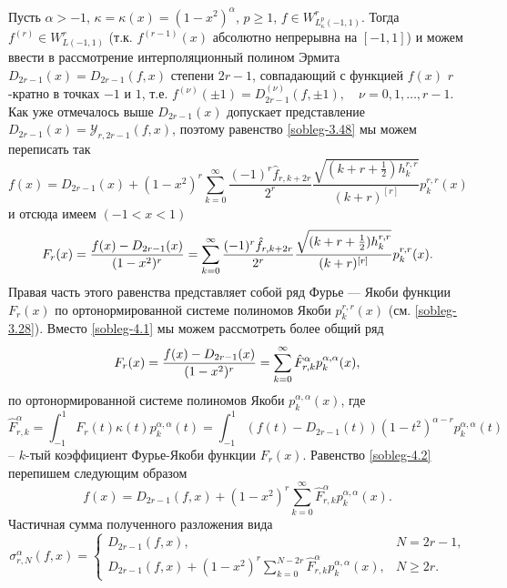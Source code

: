 Пусть $\alpha>-1$, $\kappa=\kappa(x)=(1-x^2)^\alpha$, $p\ge1$, $f\in W^r_{L^p_\kappa(-1,1)}$. Тогда $f^{(r)}\in W^r_{L(-1,1)}$ (т.к. $f^{(r-1)}(x)$ абсолютно непрерывна на $[-1,1]$) и можем ввести в рассмотрение интерполяционный полином Эрмита $D_{2r-1}(x)=D_{2r-1}(f,x)$ степени $2r-1$,  совпадающий с функцией $f(x)$ $r$-кратно в точках $-1$ и $1$, т.е. $f^{(\nu)}(\pm1)=D_{2r-1}^{(\nu)}(f,\pm1),\quad \nu=0,1,\ldots, r-1$. Как уже отмечалось выше  $D_{2r-1}(x)$ допускает представление $D_{2r-1}(x)=\mathcal{ Y}_{r,2r-1}(f,x)$, поэтому равенство \eqref{sobleg-3.48} мы можем переписать так
\begin{equation*}
f(x)=D_{2r-1}(x)+
(1-x^2)^r\sum_{k=0}^\infty\frac{(-1)^r\hat f_{r,k+2r}}{2^r} \frac{\sqrt{(k+r+\frac12)h_k^{r,r}}}{ (k+r)^{[r]}}p_{k}^{r,r}(x)
 \end{equation*}
 и отсюда имеем $(-1<x<1)$
\begin{equation}\label{sobleg-4.1}
F_r(x)={f(x)-D_{2r-1}(x)\over(1-x^2)^r}=
 \sum_{k=0}^\infty\frac{(-1)^r\hat f_{r,k+2r}}{2^r} \frac{\sqrt{(k+r+\frac12)h_k^{r,r}}}{ (k+r)^{[r]}}p_{k}^{r,r}(x).
\end{equation}
Правая часть этого равенства представляет собой ряд Фурье --- Якоби функции $F_r(x)$ по ортонормированной системе полиномов Якоби $p_k^{r,r}(x)$ (см. \eqref{sobleg-3.28}). Вместо \eqref{sobleg-4.1} мы можем рассмотреть более общий ряд
\begin{equation}\label{sobleg-4.2}
F_r(x)={f(x)-D_{2r-1}(x)\over(1-x^2)^r}=
 \sum_{k=0}^\infty \hat F_{r,k}^\alpha p_{k}^{\alpha,\alpha}(x),
\end{equation}
по ортонормированной системе полиномов Якоби $p_{k}^{\alpha,\alpha}(x)$, где
\begin{equation}\label{sobleg-4.3}
\hat F^\alpha_{r,k}=\int_{-1}^1F_r(t)\kappa(t) p_{k}^{\alpha,\alpha}(t)=\int_{-1}^1(f(t)-D_{2r-1}(t))(1-t^2)^{\alpha-r} p_{k}^{\alpha,\alpha}(t)
\end{equation}
-- $k$-тый коэффициент Фурье-Якоби функции $F_r(x)$. Равенство \eqref{sobleg-4.2} перепишем следующим образом
\begin{equation}\label{sobleg-4.4}
f(x)=D_{2r-1}(f,x)+(1-x^2)^r \sum_{k=0}^\infty \hat F^\alpha_{r,k}p_{k}^{\alpha,\alpha}(x).
\end{equation}
Частичная сумма полученного разложения вида
\begin{equation}\label{sobleg-4.5}
 \sigma_{r,N}^\alpha(f,x)=
 \begin{cases}
  D_{2r-1}(f,x),&\text{$N=2r-1$,}\\
 D_{2r-1}(f,x)+(1-x^2)^r \sum_{k=0}^{N-2r} \hat F^\alpha_{r,k}p_{k}^{\alpha,\alpha}(x),&\text{$N\ge 2r$.}
 \end{cases}
\end{equation}
